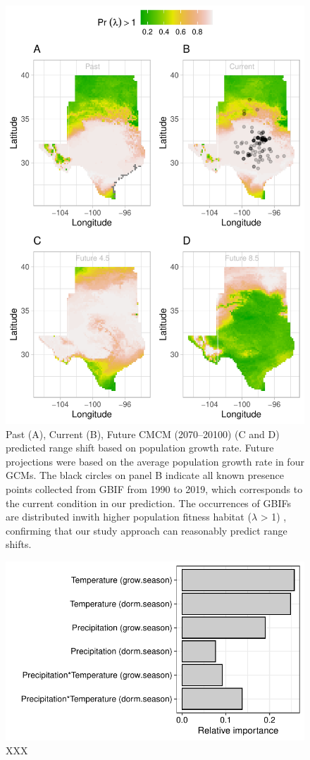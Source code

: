 \documentclass[12pt]{article}
\begin{document}
\begin{figure}%
  \begin{center}
    \includegraphics[width=0.78\linewidth]{Figures/Fig_geoPrlambdaprojectioncmc.pdf}
  \caption{Past (A), Current (B), Future CMCM (2070–20100) (C and D) predicted range shift based on population growth rate. Future projections were based on the average population growth rate in four GCMs. The black circles on panel B indicate all known presence points collected from GBIF from 1990 to 2019, which corresponds to the current condition in our prediction.  The occurrences of GBIFs are distributed inwith higher population fitness habitat ($\lambda$ > 1) , confirming that our study approach can reasonably predict range shifts. }
  \label{fig:geoproj}
  \end{center}
\end{figure}

\begin{figure}[h!]
  \begin{center}
    \includegraphics[width=0.55\linewidth]{Figures/Fig_LTRE.pdf}
  \caption{XXX}
  \label{Sup:LTRE}
  \end{center}
\end{figure}
\end{document}
